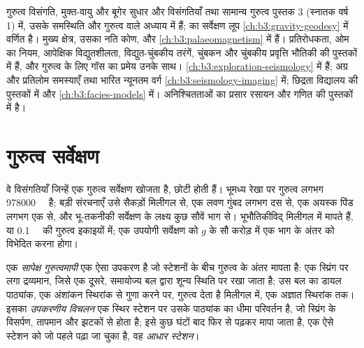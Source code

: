 \begin{recall}
गुरुत्व विसंगति, मुक्त-वायु और बूगेर सुधार और विसंगतियाँ
तथा सामान्य गुरुत्व पुस्तक 3 (स्नातक वर्ष 1) में, उसके समस्थिति और गुरुत्व वाले अध्याय में हैं;
 का सर्वेक्षण लूप
\cref{ch:b3:gravity-geodesy} में वर्णित है। मुख्य क्षेत्र, उसका नति कोण,
 और 
\cref{ch:b3:palaeomagnetism} में हैं। प्रतिरोधकता, ओम का
नियम, आपेक्षिक विद्युतशीलता, विद्युत-चुंबकीय तरंगें, चुंबकन और चुंबकीय
प्रवृत्ति भौतिकी की पुस्तकों में हैं, और गुरुत्व के लिए गॉस का प्रमेय
उनके साथ। 
\cref{ch:b3:exploration-seismology} में हैं; अग्र और प्रतिलोम समस्याएँ तथा भारित न्यूनतम वर्ग
\cref{ch:b3:seismology-imaging} में; छिद्रता विद्यालय की पुस्तकों में और
 \cref{ch:b3:facies-models} में।
अनिश्चितताओं का प्रसार रसायन और गणित की पुस्तकों में है।
\end{recall}

\section{गुरुत्व सर्वेक्षण}\label{sec:b3:field-lab-methods-3:gravity}

वे विसंगतियाँ जिन्हें एक गुरुत्व सर्वेक्षण खोजता है, छोटी होती हैं। भूमध्य रेखा पर गुरुत्व
लगभग \qty{978000}{\milli\gal} है; बड़ी संरचनाएँ उसे
सैकड़ों मिलीगल से, एक लवण गुंबद लगभग दस से, एक अयस्क पिंड लगभग
एक से, और भू-तकनीकी सर्वेक्षण के लक्ष्य कुछ
सौवें भाग से। भूभौतिकीविद् मिलीगल में मापते हैं,
या \qty{0.1}{\milli\gal} की गुरुत्व इकाइयों में; एक उपयोगी सर्वेक्षण
को $g$ के सौ करोड़ में एक भाग के अंतर को विभेदित करना होगा।

\begin{definition}\label{def:b3:field-lab-methods-3:gravimeter}
एक \emph{सापेक्ष गुरुत्वमापी} एक ऐसा उपकरण है
जो स्टेशनों के बीच गुरुत्व के अंतर मापता है: एक स्प्रिंग पर लगा द्रव्यमान,
जिसे एक दूसरे, समायोज्य बल द्वारा शून्य स्थिति पर रखा जाता है; उस बल का
डायल पाठ्यांक, एक अंशांकन स्थिरांक से गुणा करने पर, गुरुत्व देता है
मिलीगल में, एक अज्ञात स्थिरांक तक। इसका \emph{उपकरणीय
विचलन} एक स्थिर स्टेशन पर उसके पाठ्यांक का धीमा परिवर्तन है,
जो स्प्रिंग के विसर्पण, तापमान और झटकों से होता है; इसे कुछ घंटों बाद
फिर से पढ़कर मापा जाता है, एक ऐसे स्टेशन को जो पहले पढ़ा जा चुका है,
वह \emph{आधार स्टेशन}।
\end{definition}

